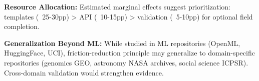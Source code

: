 \textbf{Resource Allocation:} Estimated marginal effects suggest prioritization: templates (~25-30pp) > API (~10-15pp) > validation (~5-10pp) for optional field completion.

\textbf{Generalization Beyond ML:} While studied in ML repositories (OpenML, HuggingFace, UCI), friction-reduction principle may generalize to domain-specific repositories (genomics GEO, astronomy NASA archives, social science ICPSR). Cross-domain validation would strengthen evidence.
